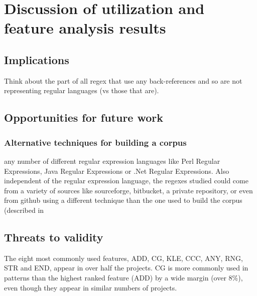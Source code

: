 \section{Discussion of utilization and feature analysis results}
\label{sec:featureDiscussion}

\subsection{Implications}
Think about the part of all regex that use any back-references and so are not representing regular languages (vs those that are).
\subsection{Opportunities for future work}

\subsubsection{Alternative techniques for building a corpus}
\label{sec:alternateCorpus}
any number of different regular expression languages like Perl Regular Expressions, Java Regular Expressions or .Net Regular Expressions.  Also independent of the regular expression language, the regexes studied could come from a variety of sources like sourceforge, bitbucket, a private repository, or even from github using a different technique than the one used to build the corpus (described in


\subsection{Threats to validity}



The eight most commonly used features, ADD, CG, KLE, CCC, ANY, RNG, STR and END,
appear in over half the projects.
CG is more commonly used in patterns than the highest ranked feature (ADD) by a wide margin (over 8\%), even though they appear in similar numbers of projects.




